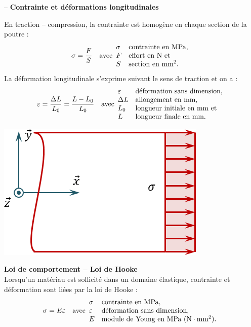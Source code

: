 \documentclass[10pt,fleqn]{article} %
\begin{document}
\begin{defi} -- 
\textbf{Contrainte et déformations longitudinales} ~\\
\begin{minipage}[c]{.7\linewidth}
En traction -- compression, la contrainte est homogène en chaque section de la poutre : 
$$ \sigma = \dfrac{F}{S}
\quad 
\text{avec}
\begin{array}{ll}
\sigma &\text{contrainte en \text{MPa}},\\
F &\text{effort en N et} \\
S &\text{section en mm}^2.
\end{array}
$$
La déformation longitudinale s'exprime suivant le sens de traction et on a :
$$
\varepsilon = \dfrac{\Delta L}{L_0} = \dfrac{L-L_0}{L_0}
\quad 
\text{avec}
\begin{array}{ll}
\varepsilon &\text{déformation sans dimension,}\\
\Delta L &\text{allongement en \text{mm},} \\
L_0 &\text{longueur initiale en mm et} \\
L &\text{longueur finale en mm.} \\
\end{array}
$$
\end{minipage} \hfill
\begin{minipage}[c]{.25\linewidth}
\begin{center}
\includegraphics[width=.9\linewidth]{images/contrainte_traction}
\end{center}
\end{minipage}
\end{defi}


\begin{resultat}
\textbf{Loi de comportement -- Loi de Hooke} ~\\
Lorsqu'un matériau est sollicité dans un domaine élastique, contrainte et déformation sont liées par la loi de Hooke : 
$$ \sigma = E \varepsilon
\quad 
\text{avec}
\begin{array}{ll}
\sigma &\text{contrainte en \text{MPa}},\\
\varepsilon &\text{déformation sans dimension,}\\
E &\text{module de Young en MPa (N}\cdot\text{mm}^2\text{).}
\end{array}
$$
\end{resultat}
\end{document}
